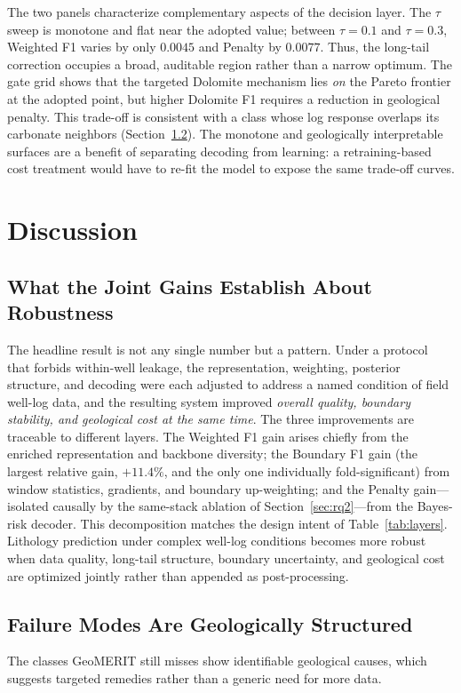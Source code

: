 \documentclass[bdcc,article,submit,pdftex,moreauthors]{Definitions/mdpi}
\begin{document}
The two panels characterize complementary aspects of the decision layer. The $\tau$ sweep is
monotone and flat near the adopted value; between $\tau=0.1$ and $\tau=0.3$, Weighted F1 varies
by only $0.0045$ and Penalty by $0.0077$. Thus, the long-tail correction occupies a broad,
auditable region rather than a narrow optimum. The gate grid shows that the targeted Dolomite
mechanism lies \emph{on} the Pareto frontier at the adopted point, but higher Dolomite F1
requires a reduction in geological penalty. This trade-off is consistent with a class whose log
response overlaps its carbonate neighbors (Section~\ref{sec:failures}). The monotone and
geologically interpretable surfaces are a benefit of separating decoding from learning: a
retraining-based cost treatment would have to re-fit the model to expose the same trade-off
curves.

\section{Discussion}
\label{sec:discussion}

\subsection{What the Joint Gains Establish About Robustness}
\label{sec:joint}
The headline result is not any single number but a pattern. Under a protocol that forbids
within-well leakage, the representation, weighting, posterior structure, and decoding were each
adjusted to address a named condition of field well-log data, and the resulting system improved
\emph{overall quality, boundary stability, and geological cost at the same time}. The three
improvements are traceable to different layers. The Weighted F1 gain arises chiefly from the
enriched representation and backbone diversity; the Boundary F1 gain (the largest relative
gain, $+11.4\%$, and the only one individually fold-significant) from window statistics,
gradients, and boundary up-weighting; and the Penalty gain---isolated causally by the
same-stack ablation of Section~\ref{sec:rq2}---from the Bayes-risk decoder. This decomposition
matches the design intent of Table~\ref{tab:layers}. Lithology prediction under complex
well-log conditions becomes more robust when data quality, long-tail structure, boundary
uncertainty, and geological cost are optimized jointly rather than appended as post-processing.

\subsection{Failure Modes Are Geologically Structured}
\label{sec:failures}
The classes GeoMERIT still misses show identifiable geological causes, which suggests targeted
remedies rather than a generic need for more data.
\end{document}
